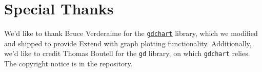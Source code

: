 \chapter{Special Thanks}
We'd like to thank Bruce Verderaime for the \underline{\href{http://users.fred.net/brv/chart/}{\texttt{gdchart}}} library, which we modified and shipped to provide Extend with graph plotting functionality. Additionally, we'd like to credit Thomas Boutell for the \texttt{gd} library, on which \texttt{gdchart} relies. The copyright notice is in the repository.
